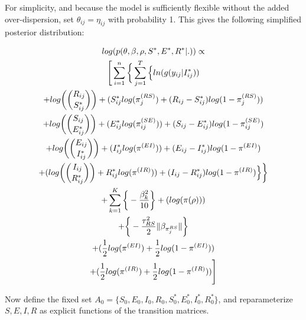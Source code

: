 \documentclass[12pt]{article}
\begin{document}
For simplicity, and because the model is sufficiently flexible without the added over-dispersion, set $\theta_{ij} = \eta_{ij}$ with probability 1. This 
gives the following simplified posterior distribution:

\begin{center}
\begin{multline}
\displaystyle
log(p(\theta,\beta,\rho,S^*,E^*,R^*|.)) \propto \\
\Bigg[ \sum_{i=1}^n \bigg\{ \sum_{j=1}^T
        \Big\{
            ln(g(y_{ij}|I^*_{ij})) \\ 
            + log\bigg(\dbinom{R_{ij}}{S^*_{ij}}\bigg) + (S^*_{ij}log(\pi_j^{(RS)}) + (R_{ij} - S^*_{ij})log(1-\pi_j^{(RS)})) \\
            + log\bigg(\dbinom{S_{ij}}{E^*_{ij}}\bigg) + (E^*_{ij}log(\pi_{ij}^{(SE)})) + (S_{ij} - E^*_{ij})log(1-\pi_{ij}^{(SE)}) \\
            + log\bigg(\dbinom{E_{ij}}{I^*_{ij}}\bigg) + (I^*_{ij}log(\pi^{(EI)})) + (E_{ij} - I^*_{ij})log(1-\pi^{(EI)}) \\
            + (log\bigg(\dbinom{I_{ij}}{R^*_{ij}}\bigg) + R^*_{ij}log(\pi^{(IR)})) + (I_{ij} - R^*_{ij})log(1-\pi^{(IR)}) \Big\}\bigg\} \\
    + \sum_{k = 1}^K\bigg\{-\frac{\beta^2_k}{10}\bigg\}
            + (log(\pi(\rho)))\\
            +  \bigg\{ -\frac{\tau^2_{RS}}{2}\|\beta_{\pi_j^{RS}}\|  \bigg\} \\ 
            + (\frac{1}{2}log(\pi^{(EI)}) + \frac{1}{2}log(1-\pi^{(EI)})) \\
            + (\frac{1}{2}log(\pi^{(IR)}) + \frac{1}{2}log(1-\pi^{(IR)}))\Bigg]\\
\end{multline}
\end{center}

Now define the fixed set $A_0 = \{S_0, E_0, I_0, R_0, S^*_0, E^*_0, I^*_0, R^*_0\}$,
and reparameterize $S, E, I, R$ as explicit functions of the transition matrices. 
\end{document}
